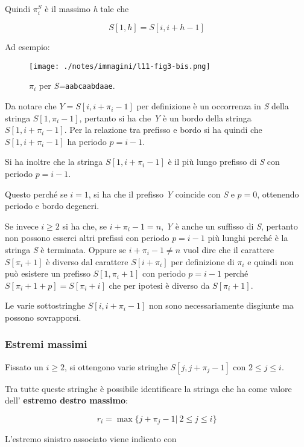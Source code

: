 Quindi $\pi_i^S$ è il massimo \emph{h} tale che

$$
S[1,h] = S[i, i+h-1]
$$

Ad esempio:

\begin{figure}[htbp]
\centering
\texttt{[image: ./notes/immagini/l11-fig3-bis.png]}
\caption{$\pi_i$ per \textit{S=}\texttt{aabcaabdaae}.}
\end{figure}

Da notare che $Y = S[i, i+\pi_i -1]$ per definizione è un occorrenza in \textit{S} della stringa $S[1, \pi_i -1]$, pertanto si ha che \textit{Y} è un bordo della stringa $S[1, i +\pi_i -1]$. 
Per la relazione tra prefisso e bordo si ha quindi che $S[1, i +\pi_i -1]$ ha periodo $p = i -1$.

Si ha inoltre che la stringa $S[1, i +\pi_i -1]$ è il più lungo prefisso di \textit{S} con periodo $p= i-1$.

Questo perché se $i = 1$, si ha che il prefisso \textit{Y} coincide con \textit{S} e $p=0$, ottenendo periodo e bordo degeneri.

Se invece $ i \geq 2 $ si ha che, se $i + \pi_i -1 = n $, \textit{Y} è anche un suffisso di \textit{S}, pertanto non possono esserci altri prefissi con periodo $p = i -1$ più lunghi perché è la stringa \textit{S} è terminata.
Oppure se $i + \pi_i -1 \neq n $ vuol dire che il carattere $ S[\pi_i + 1] $ è diverso dal carattere $ S[i+\pi_i] $ per definizione di $ \pi_i $ e quindi non può esistere un prefisso $ S[1, \pi_i +1] $ con periodo $p = i -1$ perché $ S[\pi_i  + 1 + p] = S[\pi_i + i] $ che per ipotesi è diverso da $ S[\pi_i +1] $.

Le varie sottostringhe $ S[i, i + \pi_i -1 ] $ non sono necessariamente disgiunte ma possono sovrapporsi.

\subsubsection{Estremi massimi}

Fissato un $ i \geq 2 $, si ottengono varie stringhe $ S[j, j + \pi_j -1] $ con $ 2 \leq j \leq i $.

Tra tutte queste stringhe è possibile identificare la stringa che ha come valore dell' \textbf{estremo destro massimo}:

$$
r_i = \max \{ j + \pi_j -1 | \: 2 \leq j \leq i\}
$$

L'estremo sinistro associato viene indicato con 

